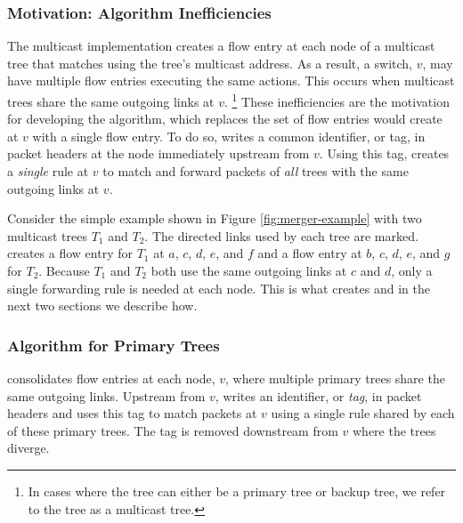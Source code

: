\subsubsection{Motivation: \basen Algorithm Inefficiencies}
\label{subsubsec:merge-motivate}

The \base multicast implementation creates a flow entry at each node of a multicast tree that matches using the tree's multicast address. 
As a result, a switch, $v$, may have multiple flow entries executing the same actions.  This occurs when multicast trees share the same outgoing links at $v$. 
\footnote{In cases where the tree can either be a primary tree or backup tree, we refer to the tree as a multicast tree.}
These inefficiencies are the motivation for developing the \merge algorithm, which replaces the set of flow entries \base would create at $v$ with a single flow entry. 
To do so, \merge writes a common identifier, or tag, in packet headers at the node immediately upstream from $v$. Using this tag, \merge creates a \emph{single} rule at $v$ to match and 
forward packets of \emph{all} trees with the same outgoing links at $v$.

Consider the simple example shown in Figure \ref{fig:merger-example} with two multicast trees $T_1$ and $T_2$. The directed links used by each tree are marked.
\base creates a flow entry for $T_1$ at $a$, $c$, $d$, $e$, and $f$ and a flow entry at $b$, $c$, $d$, $e$, and $g$ for $T_2$.  Because 
$T_1$ and $T_2$ both use the same outgoing links at $c$ and $d$, only a single forwarding rule is needed at each node.  This is what \merge creates and in the next two sections we describe how.





\subsubsection{\mergen Algorithm for Primary Trees}
\label{subsubsec:merge-primary}


\merge consolidates flow entries at each node, $v$, where multiple primary trees share the same outgoing links. 
Upstream from $v$, \merge writes an identifier, or \emph{tag}, in packet headers and uses this tag to match packets at $v$ using a single rule shared by each of these primary trees.
The tag is removed downstream from $v$ where the trees diverge. 

